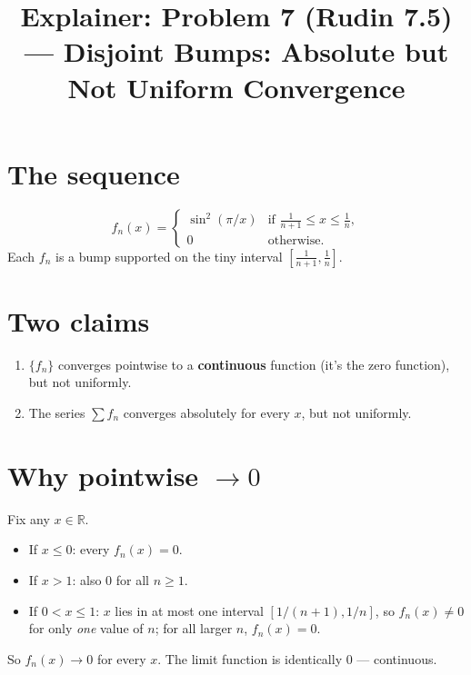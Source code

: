 \documentclass[12pt]{article}
\title{Explainer: Problem 7 (Rudin 7.5) --- Disjoint Bumps: Absolute but Not Uniform Convergence}
\author{}
\date{}
\begin{document}
\maketitle

\section*{The sequence}
$$
f_n(x) = \begin{cases}
\sin^2(\pi/x) & \text{if } \frac{1}{n+1} \leq x \leq \frac{1}{n}, \\
0 & \text{otherwise}.
\end{cases}
$$
Each $f_n$ is a bump supported on the tiny interval $\left[\frac{1}{n+1}, \frac{1}{n}\right]$.

\begin{center}
\end{center}

\section*{Two claims}
\begin{enumerate}
  \item $\{f_n\}$ converges pointwise to a \textbf{continuous} function (it's the zero function), but not uniformly.
  \item The series $\sum f_n$ converges absolutely for every $x$, but not uniformly.
\end{enumerate}

\section*{Why pointwise $\to 0$}
Fix any $x \in \mathbb{R}$.
\begin{itemize}
  \item If $x \leq 0$: every $f_n(x) = 0$.
  \item If $x > 1$: also $0$ for all $n \geq 1$.
  \item If $0 < x \leq 1$: $x$ lies in at most one interval $[1/(n+1), 1/n]$, so $f_n(x) \neq 0$ for only \emph{one} value of $n$; for all larger $n$, $f_n(x) = 0$.
\end{itemize}
So $f_n(x) \to 0$ for every $x$. The limit function is identically $0$ --- continuous.
\end{document}
